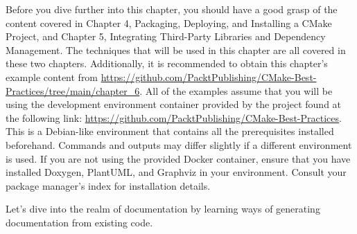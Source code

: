 Before you dive further into this chapter, you should have a good grasp of the content covered in Chapter 4, Packaging, Deploying, and Installing a CMake Project, and Chapter 5, Integrating Third-Party Libraries and Dependency Management. The techniques that will be used in this chapter are all covered in these two chapters. Additionally, it is recommended to obtain this chapter's example content from \url{https://github.com/PacktPublishing/CMake-Best-Practices/tree/main/chapter_6}. All of the examples assume that you will be using the development environment container provided by the project found at the following link: \url{https://github.com/PacktPublishing/CMake-Best-Practices}. This is a Debian-like environment that contains all the prerequisites installed beforehand. Commands and outputs may differ slightly if a different environment is used. If you are not using the provided Docker container, ensure that you have installed Doxygen, PlantUML, and Graphviz in your environment. Consult your package manager's index for installation details.

Let's dive into the realm of documentation by learning ways of generating documentation from existing code.